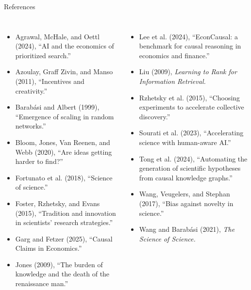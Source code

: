 \documentclass[aspectratio=169,10pt]{beamer}
\begin{document}
\begin{frame}{References}
\scriptsize
\begin{columns}[T,totalwidth=0.97\textwidth]
\begin{itemize}
  \item Agrawal, McHale, and Oettl (2024), ``AI and the economics of prioritized search.''
  \item Azoulay, Graff Zivin, and Manso (2011), ``Incentives and creativity.''
  \item Barab\'asi and Albert (1999), ``Emergence of scaling in random networks.''
  \item Bloom, Jones, Van Reenen, and Webb (2020), ``Are ideas getting harder to find?''
  \item Fortunato et al. (2018), ``Science of science.''
  \item Foster, Rzhetsky, and Evans (2015), ``Tradition and innovation in scientists' research strategies.''
  \item Garg and Fetzer (2025), ``Causal Claims in Economics.''
  \item Jones (2009), ``The burden of knowledge and the death of the renaissance man.''
\end{itemize}

\begin{itemize}
  \item Lee et al. (2024), ``EconCausal: a benchmark for causal reasoning in economics and finance.''
  \item Liu (2009), \emph{Learning to Rank for Information Retrieval.}
  \item Rzhetsky et al. (2015), ``Choosing experiments to accelerate collective discovery.''
  \item Sourati et al. (2023), ``Accelerating science with human-aware AI.''
  \item Tong et al. (2024), ``Automating the generation of scientific hypotheses from causal knowledge graphs.''
  \item Wang, Veugelers, and Stephan (2017), ``Bias against novelty in science.''
  \item Wang and Barab\'asi (2021), \emph{The Science of Science.}
\end{itemize}
\end{columns}
\end{frame}
\end{document}
